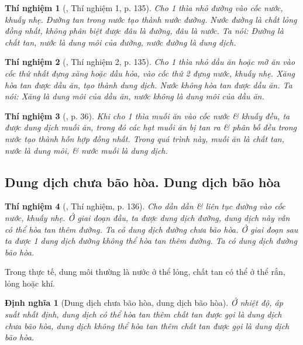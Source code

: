 \documentclass{article}
\newtheorem{dinhnghia}{Định nghĩa}
\newtheorem{thinghiem}{Thí nghiệm}
\begin{document}
\begin{thinghiem}[\cite{SGK_Hoa_Hoc_8}, Thí nghiệm 1, p. 135]
	Cho 1 thìa nhỏ đường vào cốc nước, khuấy nhẹ. Đường tan trong nước tạo thành nước đường. Nước đường là chất lỏng đồng nhất, không phân biệt được đâu là đường, đâu là nước. Ta nói: Đường là \emph{chất tan}, nước là \emph{dung môi} của đường, nước đường là \emph{dung dịch}.
\end{thinghiem}

\begin{thinghiem}[\cite{SGK_Hoa_Hoc_8}, Thí nghiệm 2, p. 135]
	Cho 1 thìa nhỏ dầu ăn hoặc mỡ ăn vào cốc thứ nhất đựng xăng hoặc dầu hỏa, vào cốc thứ 2 đựng nước, khuấy nhẹ. Xăng hòa tan được dầu ăn, tạo thành dung dịch. Nước không hòa tan được dầu ăn. Ta nói: Xăng là \emph{dung môi} của dầu ăn, nước không là dung môi của dầu ăn.
\end{thinghiem}

\begin{thinghiem}[\cite{SGK_KHTN_8_Canh_Dieu}, p. 36]
	Khi cho 1 thìa muối ăn vào cốc nước \& khuấy đều, ta được dung dịch muối ăn, trong đó các hạt muối ăn bị tan ra \& phân bố đều trong nước tạo thành hỗn hợp đồng nhất. Trong quá trình này, muối ăn là \emph{chất tan}, nước là \emph{dung môi}, \& nước muối là \emph{dung dịch}.
\end{thinghiem}

\subsection{Dung dịch chưa bão hòa. Dung dịch bão hòa}

\begin{thinghiem}[\cite{SGK_Hoa_Hoc_8}, Thí nghiệm, p. 136]
	Cho dần dần \& liên tục đường vào cốc nước, khuấy nhẹ. Ở giai đoạn đầu, ta được dung dịch đường, dung dịch này vẫn có thể hòa tan thêm đường. Ta có \emph{dung dịch đường chưa bão hòa}. Ở giai đoạn sau ta được 1 dung dịch đường không thể hòa tan thêm đường. Ta có \emph{dung dịch đường bão hòa}.
\end{thinghiem}
Trong thực tế, dung môi thường là nước ở thể lỏng, chất tan có thể ở thể rắn, lỏng hoặc khí.

\begin{dinhnghia}[Dung dịch chưa bão hòa, dung dịch bão hòa]
	Ở nhiệt độ, áp suất nhất định, dung dịch có thể hòa tan thêm chất tan được gọi là \emph{dung dịch chưa bão hòa}, dung dịch không thể hòa tan thêm chất tan được gọi là \emph{dung dịch bão hòa}.
\end{dinhnghia}
\end{document}
